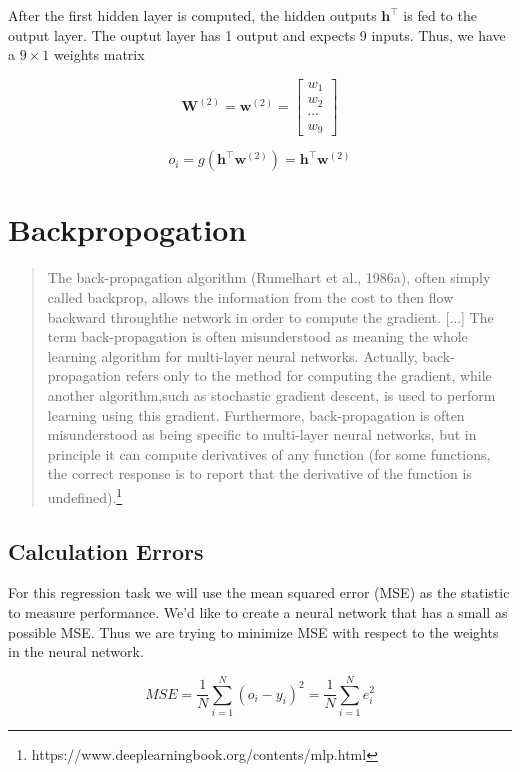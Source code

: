\documentclass[11pt]{article}%
\begin{document}
	After the first hidden layer is computed, the hidden outputs $\mathbf{h}^\intercal$ is fed to the output layer. The ouptut layer has 1 output and expects 9 inputs. Thus, we have a $9 \times 1$ weights matrix

	$$
	\mathbf{W}^{(2)} = \mathbf{w}^{(2)}
	= \begin{bmatrix}
	w_1 \\ 
	w_2 \\ 
	\cdots \\ 
	w_9
	\end{bmatrix}
	$$


	$$
	o_i = g(\mathbf{h^\intercal} \mathbf{w}^{(2)}) = \mathbf{h^\intercal} \mathbf{w}^{(2)}
	$$



\section{Backpropogation}


\begin{quote}
The back-propagation algorithm (Rumelhart et al., 1986a), often simply called backprop, allows the information from the cost to then ﬂow backward throughthe network in order to compute the gradient.
[...]
The term back-propagation is often misunderstood as meaning the whole learning algorithm for multi-layer neural networks. Actually, back-propagation refers only to the method for computing the gradient, while another algorithm,such as stochastic gradient descent, is used to perform learning using this gradient. Furthermore, back-propagation is often misunderstood as being speciﬁc to multi-layer neural networks, but in principle it can compute derivatives of any function (for some functions, the correct response is to report that the derivative of the function is undeﬁned).\footnote{https://www.deeplearningbook.org/contents/mlp.html}
\end{quote} 


\subsection{Calculation Errors}

For this regression task we will use the mean squared error (MSE) as the statistic to measure performance. We'd like to create a neural network that has a small as possible MSE. Thus we are trying to minimize MSE with respect to the weights in the neural network.

$$
MSE = \frac{1}{N} \sum^N_{i = 1} (o_i - y_i)^2 = \frac{1}{N} \sum^N_{i = 1} e_i^2 
$$
\end{document}
